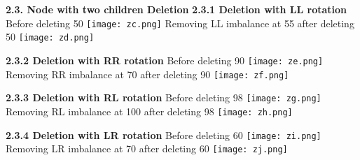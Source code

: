 \documentclass[12pt]{article}
\begin{document}
\begin{enumerate}
        \textbf{2.3. Node with two children Deletion} \newline
        \textbf{2.3.1 Deletion with LL rotation}\newline
        Before deleting 50 \newline \newline
            \texttt{[image: zc.png]} \newline 
        Removing LL imbalance at 55 after deleting 50 \newline\newline
            \texttt{[image: zd.png]}\newline
        \newpage
        
        \textbf{2.3.2 Deletion with RR rotation}\newline
        Before deleting 90 \newline \newline
            \texttt{[image: ze.png]} \newline 
        Removing RR imbalance at 70 after deleting 90 \newline \newline
            \texttt{[image: zf.png]}\newline
        \newpage
        
        \textbf{2.3.3 Deletion with RL rotation}\newline
        Before deleting 98 \newline \newline
            \texttt{[image: zg.png]} \newline 
        Removing RL imbalance at 100 after deleting 98 \newline \newline
            \texttt{[image: zh.png]}\newline
        \newpage
        
        \textbf{2.3.4 Deletion with LR rotation}\newline
        Before deleting 60 \newline \newline
            \texttt{[image: zi.png]} \newline 
        Removing LR imbalance at 70 after deleting 60 \newline \newline
            \texttt{[image: zj.png]}
        \newpage
        

\end{enumerate}
\end{document}
